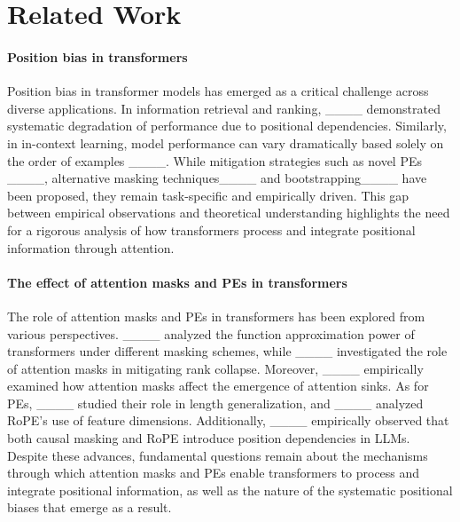 \section{Related Work}
\paragraph{Position bias in transformers}
Position bias in transformer models has emerged as a critical challenge across diverse applications. In information retrieval and ranking, ____ demonstrated systematic degradation of performance due to positional dependencies. Similarly, in in-context learning, model performance can vary dramatically based solely on the order of examples ____. While mitigation strategies such as novel PEs  ____, alternative masking techniques____ and bootstrapping____ have been proposed, they remain task-specific and empirically driven. This gap between empirical observations and theoretical understanding highlights the need for a rigorous analysis of how transformers process and integrate positional information through attention.


\paragraph{The effect of attention masks and PEs in transformers} 
The role of attention masks and PEs in transformers has been explored from various perspectives. ____ analyzed the function approximation power of transformers under different masking schemes, while ____ investigated the role of attention masks in mitigating rank collapse. Moreover, ____ empirically examined how attention masks affect the emergence of attention sinks. As for PEs, ____ studied their role in length generalization, and ____ analyzed RoPE’s use of feature dimensions. Additionally, ____ empirically observed that both causal masking and RoPE introduce position dependencies in LLMs. Despite these advances, fundamental questions remain about the mechanisms through which attention masks and PEs enable transformers to process and integrate positional information, as well as the nature of the systematic positional biases that emerge as a result.